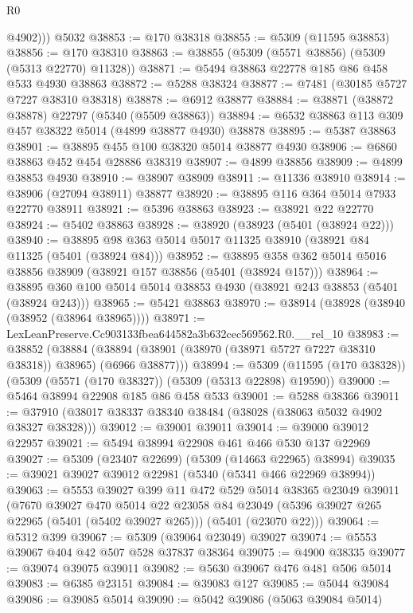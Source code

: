 \begin{lexlean}{R0}
\begin{coremodule}
          @4902)))
    @5032
@38853 := @170 @38318
@38855 := @5309 (@11595 @38853)
@38856 := @170 @38310
@38863 := @38855 (@5309 (@5571 @38856) (@5309 (@5313 @22770) @11328))
@38871 := @5494 @38863 @22778 @185 @86 @458 @533 @4930 @38863
@38872 := @5288 @38324
@38877 := @7481 (@30185 @5727 @7227 @38310 @38318)
@38878 := @6912 @38877
@38884 := @38871 (@38872 @38878) @22797 (@5340 (@5509 @38863))
@38894 := @6532 @38863 @113 @309 @457 @38322 @5014 (@4899 @38877 @4930) @38878
@38895 := @5387 @38863
@38901 := @38895 @455 @100 @38320 @5014 @38877 @4930
@38906 := @6860 @38863 @452 @454 @28886 @38319
@38907 := @4899 @38856
@38909 := @4899 @38853 @4930
@38910 := @38907 @38909
@38911 := @11336 @38910
@38914 := @38906 (@27094 @38911) @38877
@38920 := @38895 @116 @364 @5014 @7933 @22770 @38911
@38921 := @5396 @38863
@38923 := @38921 @22 @22770
@38924 := @5402 @38863
@38928 := @38920 (@38923 (@5401 (@38924 @22)))
@38940 := @38895 @98 @363 @5014 @5017 @11325 @38910 (@38921 @84 @11325 (@5401 (@38924 @84)))
@38952 := @38895 @358 @362 @5014 @5016 @38856 @38909 (@38921 @157 @38856 (@5401 (@38924 @157)))
@38964 := @38895 @360 @100 @5014 @5014 @38853 @4930 (@38921 @243 @38853 (@5401 (@38924 @243)))
@38965 := @5421 @38863
@38970 := @38914 (@38928 (@38940 (@38952 (@38964 @38965))))
@38971 := LexLeanPreserve.Cc903133fbea644582a3b632cec569562.R0.__rel_10
@38983 := @38852
    (@38884 (@38894 (@38901 (@38970 (@38971 @5727 @7227 @38310 @38318)) @38965) (@6966 @38877)))
@38994 := @5309 (@11595 (@170 @38328)) (@5309 (@5571 (@170 @38327)) (@5309 (@5313 @22898) @19590))
@39000 := @5464 @38994 @22908 @185 @86 @458 @533
@39001 := @5288 @38366
@39011 := @37910 (@38017 @38337 @38340 @38484 (@38028 (@38063 @5032 @4902 @38327 @38328)))
@39012 := @39001 @39011
@39014 := @39000 @39012 @22957
@39021 := @5494 @38994 @22908 @461 @466 @530 @137 @22969
@39027 := @5309 (@23407 @22699) (@5309 (@14663 @22965) @38994)
@39035 := @39021 @39027 @39012 @22981 (@5340 (@5341 @466 @22969 @38994))
@39063 := @5553
    @39027
    @399
    @11
    @472
    @529
    @5014
    @38365
    @23049
    @39011
    (@7670
      @39027
      @470
      @5014
      @22
      @23058
      @84
      @23049
      (@5396 @39027 @265 @22965 (@5401 (@5402 @39027 @265)))
      (@5401 (@23070 @22)))
@39064 := @5312 @399
@39067 := @5309 (@39064 @23049) @39027
@39074 := @5553 @39067 @404 @42 @507 @528 @37837 @38364
@39075 := @4900 @38335
@39077 := @39074 @39075 @39011
@39082 := @5630 @39067 @476 @481 @506 @5014
@39083 := @6385 @23151
@39084 := @39083 @127
@39085 := @5044 @39084
@39086 := @39085 @5014
@39090 := @5042 @39086 (@5063 @39084 @5014)

\end{coremodule}
\end{lexlean}
